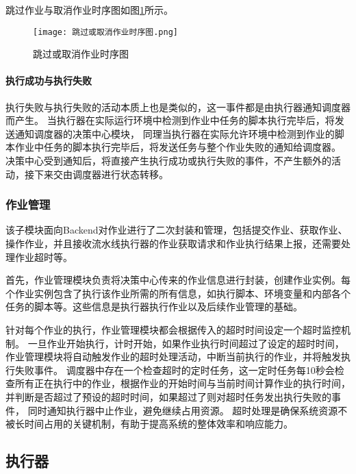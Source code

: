 跳过作业与取消作业时序图如图\ref{fig:跳过或取消作业时序图}所示。

\begin{figure}[h]
  \centering
  \texttt{[image: 跳过或取消作业时序图.png]}
  \caption{跳过或取消作业时序图}
  \label{fig:跳过或取消作业时序图}
\end{figure}

\paragraph{执行成功与执行失败}
执行失败与执行失败的活动本质上也是类似的，这一事件都是由执行器通知调度器而产生。
当执行器在实际运行环境中检测到作业中任务的脚本执行完毕后，将发送通知调度器的决策中心模块，
同理当执行器在实际允许环境中检测到作业的脚本作业中任务的脚本执行完毕后，将发送任务与整个作业失败的通知给调度器。
决策中心受到通知后，将直接产生执行成功或执行失败的事件，不产生额外的活动，接下来交由调度器进行状态转移。

\subsubsection{作业管理}
该子模块面向Backend对作业进行了二次封装和管理，包括提交作业、获取作业、操作作业，并且接收流水线执行器的作业获取请求和作业执行结果上报，还需要处理作业超时等。

首先，作业管理模块负责将决策中心传来的作业信息进行封装，创建作业实例。每个作业实例包含了执行该作业所需的所有信息，如执行脚本、环境变量和内部各个任务的脚本等。这些信息是执行器执行作业以及后续作业管理的基础。

针对每个作业的执行，作业管理模块都会根据传入的超时时间设定一个超时监控机制。
一旦作业开始执行，计时开始，如果作业执行时间超过了设定的超时时间，作业管理模块将自动触发作业的超时处理活动，中断当前执行的作业，并将触发执行失败事件。
调度器中存在一个检查超时的定时任务，这一定时任务每10秒会检查所有正在执行中的作业，根据作业的开始时间与当前时间计算作业的执行时间，并判断是否超过了预设的超时时间，如果超过了则对超时任务发出执行失败的事件，
同时通知执行器中止作业，避免继续占用资源。
超时处理是确保系统资源不被长时间占用的关键机制，有助于提高系统的整体效率和响应能力。

\subsection{执行器}

